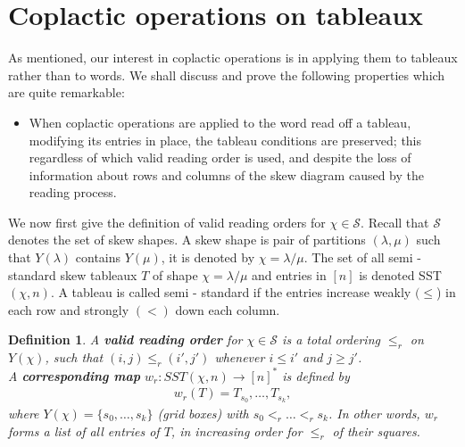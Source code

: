 \documentclass{article}
\newtheorem{defn}{Definition}
\begin{document}
\section{Coplactic operations on tableaux}
As mentioned, our interest in coplactic operations is in applying them to tableaux rather than to words. We shall discuss and prove the following properties which are quite remarkable:
\begin{itemize}
    \item When coplactic operations are applied to the word read off a tableau, modifying its entries in place, the tableau conditions are preserved; this regardless of which valid reading order is used, and despite the loss of information about rows and columns of the skew diagram caused by the reading process.
\end{itemize}
We now first give the definition of valid reading orders for $\chi \in \mathcal{S}$. Recall that $\mathcal{S}$ denotes the set of skew shapes. A skew shape is pair of partitions $(\lambda, \mu)$ such that $Y( \lambda)$ contains $Y(\mu)$, it is denoted by $\chi = \lambda/ \mu$. The set of all semi - standard skew tableaux $T$ of shape $\chi = \lambda / \mu$ and entries in $[n]$ is denoted SST$(\chi, n).$ A tableau is called semi - standard if the
entries increase weakly $(\leq$) in each row and strongly $(<)$ down each column.
\begin{defn}
A \textbf{valid reading order} for $\chi \in \mathcal{S}$ is a total ordering $\leq_r$ on $Y( \chi)$, such that $(i,j) \leq_r (i',j')$ whenever $i \leq i'$ and $j \geq j'$. \\
A \textbf{corresponding map} $w_r: SST( \chi , n) \to [n]^*$ is defined by 
\begin{align*}
    w_r(T) = T_{s_0}, \dots ,   T_{s_k},
\end{align*}
where $Y( \chi)= \{ s_0, \dots , s_k\}$ (grid boxes) with $s_0 <_r \dots <_r s_k$. In other words, $w_r$ forms a list of all entries of $T$, in increasing order for $\leq_r$ of their squares. 
\end{defn}
\end{document}
